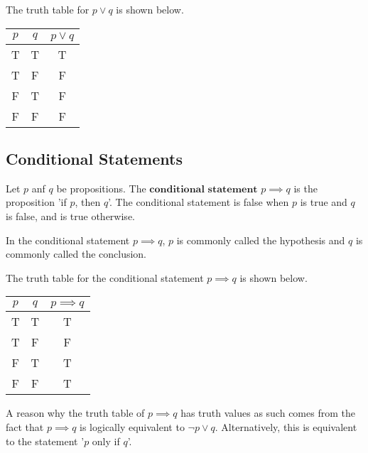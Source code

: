 \documentclass{article}
\newtheorem{definition}{Definition}[subsection]
\newtheorem{remark}{Remark}[subsection]
\begin{document}
The truth table for $p \lor q$ is shown below.
\begin{table}[h]
    \centering
    \begin{tabular}{|c|c|c|}
    \hline
     $p$ & $q$& $p \lor q$\\ \hline
     T  & T & T\\ \hline
     T & F &F\\ \hline
     F&T&F\\ \hline
     F&F&F\\ \hline
    \end{tabular}
\end{table}
\subsection{Conditional Statements}
\begin{tcolorbox}
[colback=blue!5!white,colframe=blue!75!black,title=\begin{definition}
\end{definition}] 
Let $p$ anf $q$ be propositions. The $\textbf{conditional statement}$ $p\implies q$ is the proposition 'if $p$, then $q$'. The conditional statement is false when $p$ is true and $q$ is false, and is true otherwise. 
\end{tcolorbox}
\begin{tcolorbox}
[colback=cyan!5!white,colframe=cyan!75!black,title=\begin{remark}
\end{remark}]    
In the conditional statement $p \implies q$, $p$ is commonly called the hypothesis and $q$ is commonly called the conclusion.
\end{tcolorbox}
\newpage
The truth table for the conditional statement $p \implies q$ is shown below.
\begin{table}[h]
    \centering
    \begin{tabular}{|c|c|c|}
    \hline
     $p$ & $q$& $p \implies q$\\ \hline
     T  & T & T\\ \hline
     T & F &F\\ \hline
     F&T&T\\ \hline
     F&F&T\\ \hline
    \end{tabular}
\end{table}
\begin{tcolorbox}
[colback=cyan!5!white,colframe=cyan!75!black,title=\begin{remark}
\end{remark}]
A reason why the truth table of $p \implies q$ has truth values as such comes from the fact that $p \implies q$ is logically equivalent to $\neg p \lor q$.  Alternatively, this is equivalent to the statement '$p$ only if $q$'.
\end{tcolorbox}
\end{document}
